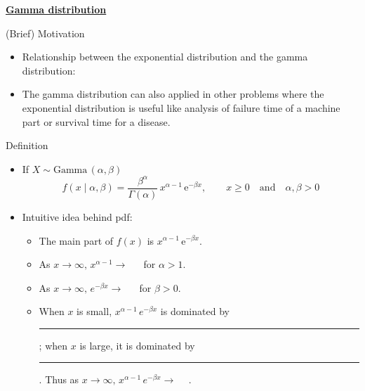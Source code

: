 \documentclass{article}
\newcommand{\bu}[1]{\textbf{\ul{#1}}}				%
\newcommand{\blankul}[1]{\rule[-1.5mm]{#1}{0.15mm}}	%
\newcommand{\follow}[1]{\sim \text{#1}\,}		%
\newcommand{\e}{\mathrm{e}}		%
\newcommand{\gam}[1]{\Gamma(#1)}		%
\begin{document}
\newpage

\bu{Gamma distribution}\bigskip

(Brief) Motivation\bigskip
\begin{itemize}
    \item Relationship between the exponential distribution and the gamma distribution:\vspace{200pt}
    \item The gamma distribution can also applied in other problems where the exponential distribution is useful like analysis of failure time of a machine part or survival time for a disease.
\end{itemize}\bigskip

Definition\bigskip
\begin{itemize}
    \item If $X \follow{Gamma}(\alpha, \beta)$
    \[f(x \mid \alpha, \beta) = \frac{\beta^\alpha}{\gam{\alpha}} \, x^{\alpha - 1} \, \e^{-\beta x}, \quad\quad x \ge 0 \quad \text{and}\quad \alpha, \beta > 0\]\vspace{20pt}
    \item Intuitive idea behind pdf: 
    \begin{itemize}
        \item The main part of $f(x)$ is $x^{\alpha - 1} \, \e^{-\beta x}$.
        \item[] As $x \rightarrow \infty , \, x^{\alpha - 1} \rightarrow \hspace{15pt}$ for $\alpha > 1$.
        \item[] As $x \rightarrow \infty , \, e^{-\beta x} \rightarrow \hspace{15pt}$ for $\beta > 0$.
        \item[] When $x$ is small, $x^{\alpha - 1} \, e^{-\beta x}$ is dominated by \blankul{2cm}; when $x$ is large, it is dominated by \blankul{2cm}. Thus as $x \rightarrow \infty , \, x^{\alpha - 1} \, e^{-\beta x} \rightarrow \hspace{15pt}$.
        
        \newpage
        

\end{itemize}
\end{itemize}
\end{document}
